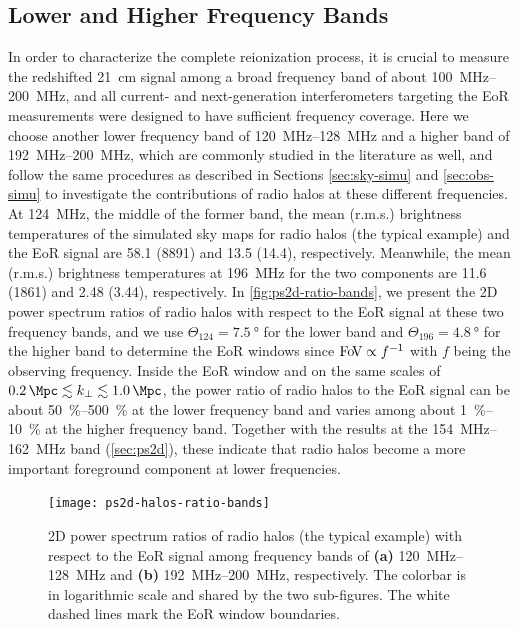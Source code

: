 \documentclass[modern]{aastex62}
\newcommand{\kperp}{\text{$k_{\bot}$}}
\newcommand{\fov}{\text{Fo\!V}}
\begin{document}
\subsection{Lower and Higher Frequency Bands}
\label{sec:freq-bands}

In order to characterize the complete reionization process, it is crucial
to measure the redshifted 21~cm signal among a broad frequency band of
about \SIrange{100}{200}{\MHz}, and all current- and next-generation
interferometers targeting the EoR measurements were designed to have
sufficient frequency coverage.
Here we choose another lower frequency band of \SIrange{120}{128}{\MHz}
and a higher band of \SIrange{192}{200}{\MHz}, which are commonly studied
in the literature as well, and follow the same procedures as described
in Sections \ref{sec:sky-simu} and \ref{sec:obs-simu} to investigate the
contributions of radio halos at these different frequencies.
At \SI{124}{\MHz}, the middle of the former band, the mean (r.m.s.)
brightness temperatures of the simulated sky maps for radio halos (the
typical example) and the EoR signal are \SI{58.1}{\mK} (\SI{8891}{\mK})
and \SI{13.5}{\mK} (\SI{14.4}{\mK}), respectively.
Meanwhile, the mean (r.m.s.) brightness temperatures at \SI{196}{\MHz}
for the two components are \SI{11.6}{\mK} (\SI{1861}{\mK})
and \SI{2.48}{\mK} (\SI{3.44}{\mK}), respectively.
In \autoref{fig:ps2d-ratio-bands}, we present the 2D power spectrum
ratios of radio halos with respect to the EoR signal at these two
frequency bands, and we use $\Theta_{124} = \SI{7.5}{\degree}$ for the
lower band and $\Theta_{196} = \SI{4.8}{\degree}$ for the higher band
to determine the EoR windows since $\fov \propto f^{-1}$ with $f$ being
the observing frequency.
Inside the EoR window and on the same scales of
$\SI{0.2}{\per\Mpc} \lesssim \kperp \lesssim \SI{1.0}{\per\Mpc}$,
the power ratio of radio halos to the EoR signal can be about
\SIrange[range-units=repeat]{50}{500}{\percent} at the lower frequency
band and varies among about \SIrange[range-units=repeat]{1}{10}{\percent}
at the higher frequency band.
Together with the results at the \SIrange{154}{162}{\MHz} band
(\autoref{sec:ps2d}), these indicate that radio halos become a more
important foreground component at lower frequencies.

\begin{figure}
  \centering
  \texttt{[image: ps2d-halos-ratio-bands]}
  \caption{\label{fig:ps2d-ratio-bands}%
    2D power spectrum ratios of radio halos (the typical example) with
    respect to the EoR signal among frequency bands of
    \textbf{(a)} \SIrange{120}{128}{\MHz} and
    \textbf{(b)} \SIrange{192}{200}{\MHz}, respectively.
    The colorbar is in logarithmic scale and shared by the
    two sub-figures.
    The white dashed lines mark the EoR window boundaries.
  }
\end{figure}
\end{document}
